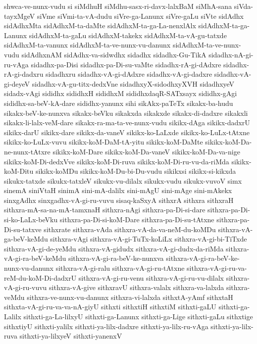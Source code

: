 {shwca-ve-nunx-vudu
si
siMdhuH
siMdhu-sasx-ri-davx-lalxBaM
siMhA-sana
siVda-tayxMgeV
siVme
siVmi-ta-vA-dudu
siVre-ga-Lanunx
siVre-gaLu
siVte
sidAdhx
sidAdhxMta
sidAdhxM-ta-daMte
sidAdhxM-ta-ga-La-nenxlAlx
sidAdhxM-ta-ga-Lanunx
sidAdhxM-ta-gaLu
sidAdhxM-takekx
sidAdhxM-ta-vA-gu-tatxde
sidAdhxM-ta-vanunx
sidAdhxM-ta-ve-nunx-vu-danunx
sidAdhxM-ta-ve-nunx-vudu
sidAdhxnAM
sidAdhx-va-sidwdhx
sidadhx
sidadhx-Gu-TikA
sidadhx-nA-gi-ru-vAga
sidadhx-pa-Disi
sidadhx-pa-Di-su-vaMte
sidadhx-rA-gi-dAdxre
sidadhx-rA-gi-dadxru
sidadhxru
sidadhx-vA-gi-dAdxre
sidadhx-vA-gi-dadxre
sidadhx-vA-gi-deyeV
sidadhx-vA-gu-titx-dedxVne
sidadhxyX-sidodhxyXVH
sidadhxyeV
sidadx-vAgi
sididhx
sididhxH
sididhxM
sididhxdaqR-SATxsayx
sididhx-gAgi
sididhx-sa-beV-kA-dare
sididhx-yanunx
sihi
sikAkx-paTeTx
sikakx-ba-hudu
sikakx-beV-ke-nunxva
sikakx-beVku
sikakxda
sikakxde
sikakx-di-dadxre
sikakxli
sikakx-li-lalx-veM-dare
sikakx-ra-ma-ta-ve-nunx-vudu
sikikx-dAga
sikikx-dadxrU
sikikx-darU
sikikx-dare
sikikx-da-vaneV
sikikx-ko-LaLxde
sikikx-ko-LuLx-tAtxne
sikikx-ko-LuLx-vuvu
sikikx-koM-DaM-tA-yitu
sikikx-koM-DaMte
sikikx-koM-Da-ne-nunx-tAtxre
sikikx-koM-Dare
sikikx-koM-Da-vaneV
sikikx-koM-Da-va-nige
sikikx-koM-Di-dedxVve
sikikx-koM-Di-ruva
sikikx-koM-Di-ru-vu-da-riMda
sikikx-koM-Ditu
sikikx-koMDu
sikikx-koM-Du-bi-Du-vudu
sikikxsi
sikikx-si-kikxda
sikukx-tatxde
sikukx-tatxleV
sikukx-vu-dilalx
sikukx-vudu
sikukx-vuvoV
simx
sinemA
siniVtaH
sinimA
sini-mA-dalilx
sini-mAgU
sini-mAge
sini-mAkekx
sinxgAdhx
sinxgadhx-vA-gi-ru-vuvu
sisaq-kaSxyA
sithxrA
sithxra
sithxraH
sithxra-mA-sa-na-mA-tamxnaH
sithxra-nAgi
sithxra-pa-Di-si-dare
sithxra-pa-Di-si-ko-LaLx-beVku
sithxra-pa-Di-si-koM-Dare
sithxra-pa-Di-su-tAtxne
sithxra-pa-Di-su-tatxve
sithxrate
sithxra-vAda
sithxra-vA-da-va-neM-du-koMDu
sithxra-vA-ga-beV-keMdu
sithxra-vAgi
sithxra-vA-gi-TuTx-koLiLx
sithxra-vA-gi-bi-TiTxde
sithxra-vA-gi-de-yeMdu
sithxra-vA-gidudx
sithxra-vA-gi-dudx-da-riMda
sithxra-vA-gi-ra-beV-keMdu
sithxra-vA-gi-ra-beV-ke-nunxva
sithxra-vA-gi-ra-beV-ke-nunx-vu-danunx
sithxra-vA-gi-ralu
sithxra-vA-gi-ru-tAtxne
sithxra-vA-gi-ru-va-reM-du-koM-Di-dadxrU
sithxra-vA-gi-ru-venu
sithxra-vA-gi-ru-vu-dilalx
sithxra-vA-gi-ru-vuvu
sithxra-vA-give
sithxravU
sithxra-valalx
sithxra-va-lalxda
sithxra-veMdu
sithxra-ve-nunx-vu-danunx
sithxra-vi-lalxda
sithxtA-yAmf
sithxtaH
sithxta-vA-gi-ru-va-va-nA-giyU
sithxti
sithxtiH
sithxtiM
sithxti-gaLU
sithxti-ga-Lalilx
sithxti-ga-La-lilxyU
sithxti-ga-Lanunx
sithxti-ga-Lige
sithxti-gaLu
sithxtige
sithxtiyU
sithxti-yalilx
sithxti-ya-lilx-dadxre
sithxti-ya-lilx-ru-vAga
sithxti-ya-lilx-ruva
sithxti-ya-lilxyeV
sithxti-yanenxV
}
